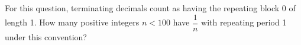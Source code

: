 For this question, terminating decimals count as having the repeating block 0 of length 1. How many positive integers $n<100$ have $\dfrac{1}{n}$ with repeating period 1 under this convention?
